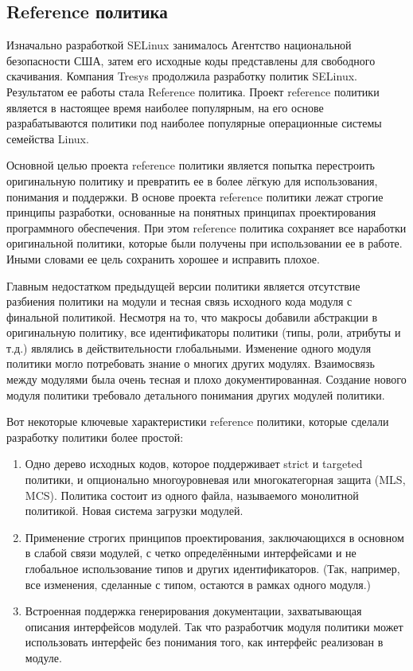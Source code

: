 \documentclass{./../class/UIR}
\begin{document}
\subsection{Reference политика}
	Изначально разработкой SELinux занималось Агентство национальной безопасности
	США, затем его исходные коды представлены для свободного скачивания. Компания
	Tresys продолжила разработку политик SELinux. Результатом ее работы стала
	Reference политика. Проект reference политики является в настоящее время
	наиболее популярным, на его основе разрабатываются политики под наиболее
	популярные операционные системы семейства Linux.
	
	Основной целью проекта reference политики является попытка перестроить
	оригинальную политику и превратить ее в более лёгкую для использования,
	понимания и поддержки. В основе проекта reference политики лежат строгие
	принципы разработки, основанные на понятных принципах проектирования
	программного обеспечения. При этом reference политика сохраняет все наработки
	оригинальной политики, которые были получены при использовании ее в работе.
	Иными словами ее цель сохранить хорошее и исправить плохое.
	
	Главным недостатком предыдущей версии политики является отсутствие разбиения
	политики на модули и тесная связь исходного кода модуля с финальной политикой.
	Несмотря на то, что макросы добавили абстракции в оригинальную политику, все
	идентификаторы политики (типы, роли, атрибуты и т.д.) являлись в
	действительности глобальными. Изменение одного модуля политики могло
	потребовать знание о многих других модулях. Взаимосвязь между модулями была
	очень тесная и плохо документированная. Создание нового модуля политики
	требовало детального понимания других модулей политики.
	
	Вот некоторые ключевые характеристики reference политики, которые сделали
	разработку политики более простой:
	
	\begin{enumerate}
	  \item Одно дерево исходных кодов, которое поддерживает strict и targeted
	  политики, и опционально многоуровневая или многокатегорная защита (MLS, MCS).
	   Политика состоит из одного файла, называемого монолитной политикой. Новая
	   система загрузки модулей.
	  \item Применение строгих принципов проектирования, заключающихся в
	   основном в слабой связи модулей, с четко определёнными интерфейсами и не
	   глобальное использование типов и других идентификаторов. (Так, например, все
	   изменения, сделанные с типом, остаются в рамках одного модуля.)
	  \item Встроенная поддержка генерирования документации, захватывающая
	  описания интерфейсов модулей. Так что разработчик модуля политики может
	  использовать интерфейс без понимания того, как интерфейс реализован в модуле.
	\end{enumerate}
	
\end{document}
